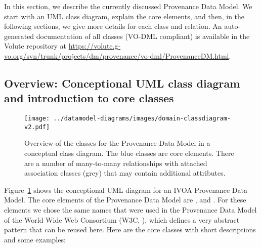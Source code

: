 % 
In this section, we describe the currently discussed Provenance Data Model. We 
start with an UML class diagram, explain the core elements, and then,
in the following sections, we give more details for each class and relation.
An auto-generated documentation of all classes (VO-DML compliant) is available
in the Volute repository at
\url{https://volute.g-vo.org/svn/trunk/projects/dm/provenance/vo-dml/ProvenanceDM.html}.

\subsection{Overview: Conceptional UML class diagram and introduction to core classes}

\begin{figure}[h]
\centering
\texttt{[image: ../datamodel-diagrams/images/domain-classdiagram-v2.pdf]}
\caption[Overview: conceptual class diagram of the Provenance Data
Model]{Overview of the classes for the Provenance Data Model in a conceptual
class diagram. The blue classes are core elements. There are a number of
many-to-many relationships with attached association classes (grey) that may
contain additional attributes.}
\label{fig:classdiagram-conceptional}
\end{figure}



Figure~\ref{fig:classdiagram-conceptional} shows the conceptional UML diagram for an IVOA Provenance Data
Model.
The core elements of the Provenance Data Model are ,
 and . For these elements we chose the same names
that were used in the Provenance Data Model of the World Wide Web Consortium
(W3C, \citealt{std:W3CProvDM}), which defines a very abstract pattern that can
be reused here. Here are the core classes with short descriptions and some
examples:

